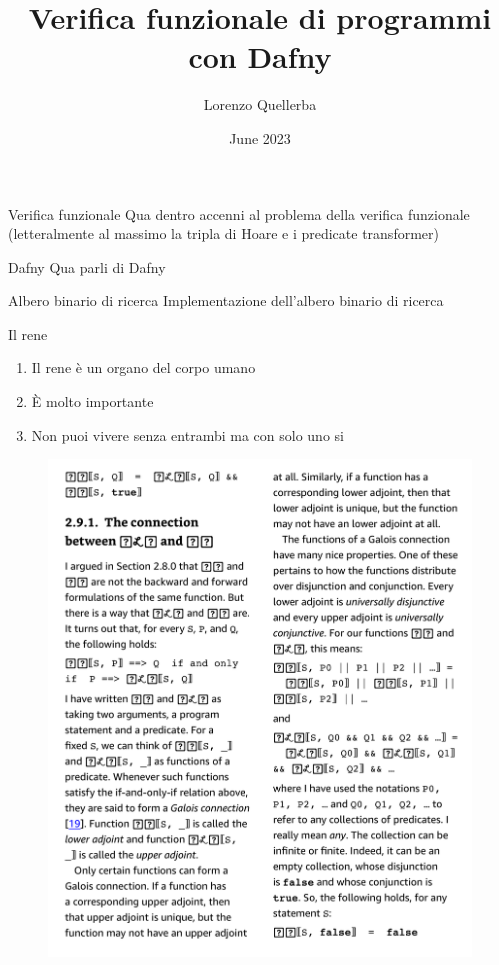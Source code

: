 \documentclass{beamer}
\title{Verifica funzionale di programmi con Dafny}
\author{Lorenzo Quellerba}
\institute{Univeristà degli Studi di Torino}
\date{June 2023}
\begin{document}
\maketitle

\begin{frame}{Verifica funzionale}
    Qua dentro accenni al problema della verifica funzionale (letteralmente al massimo la tripla di Hoare e i predicate transformer)
\end{frame}

\begin{frame}{Dafny}
    Qua parli di Dafny
\end{frame}

\begin{frame}{Albero binario di ricerca}
    Implementazione dell'albero binario di ricerca
\end{frame}

\begin{frame}{Il rene}
    \begin{enumerate}
        \item Il rene è un organo del corpo umano
        \item È molto importante
        \item Non puoi vivere senza entrambi ma con solo uno si
    \end{enumerate}
    \begin{figure}
        \includegraphics[scale=0.4]{Screenshot 2023-06-01 at 14.25.40.png}
    \end{figure}
\end{frame}
\end{document}

